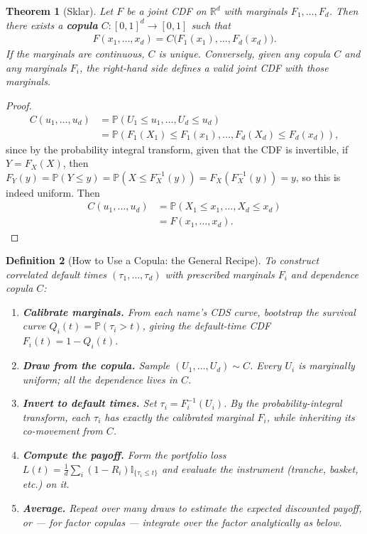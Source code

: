 \documentclass{report}
\theoremstyle{spacedplain}
\newtheorem{theorem}{Theorem}[section]
\theoremstyle{spaceddefinition}
\newtheorem{definition}[theorem]{Definition}
\theoremstyle{spacedremark}
\begin{document}
\begin{theorem}[Sklar]
Let $F$ be a joint CDF on $\mathbb{R}^d$ with marginals $F_1, \ldots, F_d$. Then there exists a \textbf{copula} $C:[0,1]^d \to [0,1]$ such that
\begin{align}
    F(x_1, \ldots, x_d) = C\bigl(F_1(x_1), \ldots, F_d(x_d)\bigr).
\end{align}
If the marginals are continuous, $C$ is unique. Conversely, given any copula $C$ and any marginals $F_i$, the right-hand side defines a valid joint CDF with those marginals.
\end{theorem}

\begin{proof}
    \begin{align}
        C(u_1, \ldots, u_d) &= \mathbb{P}(U_1 \leq u_1, \ldots, U_d \leq u_d)\\
        &=\mathbb{P}\left(F_1(X_1) \leq F_1(x_1), \ldots, F_d(X_d) \leq F_d(x_d)\right),
    \end{align}
    since by the probability integral transform, given that the CDF is invertible, if $Y = F_X(X)$, then $F_Y(y) = \mathbb{P}(Y \leq y) = \mathbb{P}(X \leq F^{-1}_X(y)) = F_X(F^{-1}_X(y)) = y$, so this is indeed uniform. Then
    \begin{align}
        C(u_1, \ldots, u_d) &=\mathbb{P}\left(X_1 \leq x_1, \ldots, X_d \leq x_d\right)\\
        & = F(x_1, \ldots, x_d).
    \end{align}
\end{proof}


\begin{definition}[How to Use a Copula: the General Recipe]\label{def:copula-recipe}
To construct correlated default times $(\tau_1, \ldots, \tau_d)$ with prescribed marginals $F_i$ and dependence copula $C$:
\begin{enumerate}
    \item \textbf{Calibrate marginals.} From each name's CDS curve, bootstrap the survival curve $Q_i(t) = \mathbb{P}(\tau_i > t)$, giving the default-time CDF $F_i(t) = 1 - Q_i(t)$.
    \item \textbf{Draw from the copula.} Sample $(U_1, \ldots, U_d) \sim C$. Every $U_i$ is marginally uniform; all the dependence lives in $C$.
    \item \textbf{Invert to default times.} Set $\tau_i = F_i^{-1}(U_i)$. By the probability-integral transform, each $\tau_i$ has exactly the calibrated marginal $F_i$, while inheriting its co-movement from $C$.
    \item \textbf{Compute the payoff.} Form the portfolio loss $L(t) = \frac{1}{d}\sum_i (1-R_i)\mathbb{I}_{\{\tau_i \leq t\}}$ and evaluate the instrument (tranche, basket, etc.) on it.
    \item \textbf{Average.} Repeat over many draws to estimate the expected discounted payoff, or --- for factor copulas --- integrate over the factor analytically as below.
\end{enumerate}
\end{definition}
\end{document}
